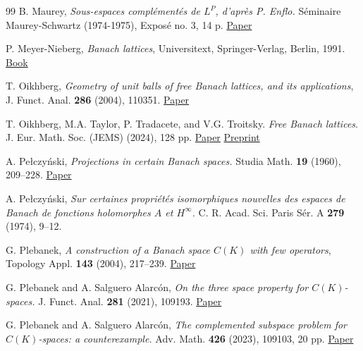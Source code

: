 \documentclass[11pt]{amsart}
\theoremstyle{definition}
\numberwithin{equation}{section}
\begin{document}
\begin{thebibliography}{99}
B. Maurey, \emph{Sous-espaces complémentés de $L^P$, d’après P. Enflo.} Séminaire Maurey-Schwartz (1974-1975), Exposé no. 3, 14 p. \href{https://www.numdam.org/item/SAF_1974-1975____A3_0/}{Paper}


P. Meyer-Nieberg, \textit{Banach lattices}, Universitext, Springer-Verlag, Berlin, 1991. \href{https://doi.org/10.1007/978-3-642-76724-1}{Book}

T. Oikhberg, \emph{Geometry of unit balls of free Banach lattices, and its applications},
J. Funct. Anal. \textbf{286} (2004), 110351. 
\href{https://doi.org/10.1016/j.jfa.2024.110351}{Paper}



 T. Oikhberg, M.A. Taylor, P. Tradacete, and V.G. Troitsky. \textit{Free Banach lattices}.
J. Eur. Math. Soc. (JEMS) (2024), 128 pp. \href{https://doi.org/10.4171/jems/1552}{Paper} \href{https://arxiv.org/abs/2210.00614}{Preprint} 



A. Pe\l{}czy\'{n}ski, \emph{Projections in certain Banach spaces.}
Studia Math. \textbf{19} (1960), 209--228. \href{https://www.impan.pl/en/publishing-house/journals-and-series/studia-mathematica/en/publishing-house/journals-and-series/studia-mathematica/all/19/2/94640/projections-in-certain-banach-spaces}{Paper}


 A. Pe\l czy\'nski, \emph{Sur certaines propriétés isomorphiques nouvelles des espaces de Banach de fonctions holomorphes $A$ et $H^\infty$.} C. R. Acad. Sci. Paris Sér. A \textbf{279} (1974), 9--12.




G. Plebanek, \emph{A construction of a Banach space $C(K)$ with few operators}, Topology Appl. \textbf{143} (2004), 217--239. \href{https://doi.org/10.1016/j.topol.2004.03.001}{Paper}




	G. Plebanek and A. Salguero Alarc\'on,
\textit{On the three space property for $C(K)$-spaces.}
J. Funct. Anal. \textbf{281}
(2021), 109193. \href{https://www.sciencedirect.com/science/article/pii/S0022123621002755}{Paper}


 G. Plebanek and A. Salguero Alarc\'on, \textit{The complemented subspace problem for $C(K)$-spaces: a counterexample.} 
	Adv. Math. \textbf{426} (2023), 109103, 20 pp. 
    \href{https://www.sciencedirect.com/science/article/abs/pii/S0001870823002463}{Paper}





\end{thebibliography}
\end{document}
